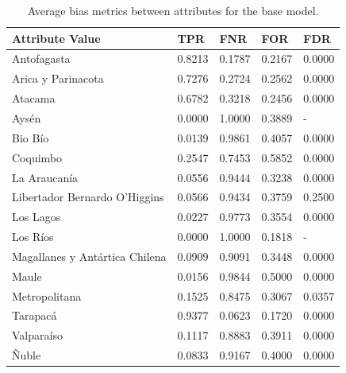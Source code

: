 \documentclass[fleqn,10pt]{wlscirep}
\begin{document}
\begin{table}[ht]
\centering
\begin{tabular}{|p{3.5cm}|p{1cm}|p{1cm}|p{1cm}|p{1cm}|}
\hline

               \textbf{Attribute Value} &    \textbf{TPR} &    \textbf{FNR} &    \textbf{FOR} &    \textbf{FDR} \\ \hline

                   Antofagasta & 0.8213 & 0.1787 & 0.2167 & 0.0000 \\
            Arica y Parinacota & 0.7276 & 0.2724 & 0.2562 & 0.0000 \\
                       Atacama & 0.6782 & 0.3218 & 0.2456 & 0.0000 \\
                         Aysén & 0.0000 & 1.0000 & 0.3889 &    - \\
                       Bio Bío & 0.0139 & 0.9861 & 0.4057 & 0.0000 \\
                      Coquimbo & 0.2547 & 0.7453 & 0.5852 & 0.0000 \\
                  La Araucanía & 0.0556 & 0.9444 & 0.3238 & 0.0000 \\
 Libertador Bernardo O'Higgins & 0.0566 & 0.9434 & 0.3759 & 0.2500 \\
                     Los Lagos & 0.0227 & 0.9773 & 0.3554 & 0.0000 \\
                      Los Ríos & 0.0000 & 1.0000 & 0.1818 &    - \\
Magallanes y Antártica Chilena & 0.0909 & 0.9091 & 0.3448 & 0.0000 \\
                         Maule & 0.0156 & 0.9844 & 0.5000 & 0.0000 \\
                 Metropolitana & 0.1525 & 0.8475 & 0.3067 & 0.0357 \\
                      Tarapacá & 0.9377 & 0.0623 & 0.1720 & 0.0000 \\
                    Valparaíso & 0.1117 & 0.8883 & 0.3911 & 0.0000 \\
                         Ñuble & 0.0833 & 0.9167 & 0.4000 & 0.0000 \\

\hline
\end{tabular}
\caption{Average bias metrics between attributes for the base model.}
\label{tab_region_tdrogas_base:}
\end{table}
\end{document}
